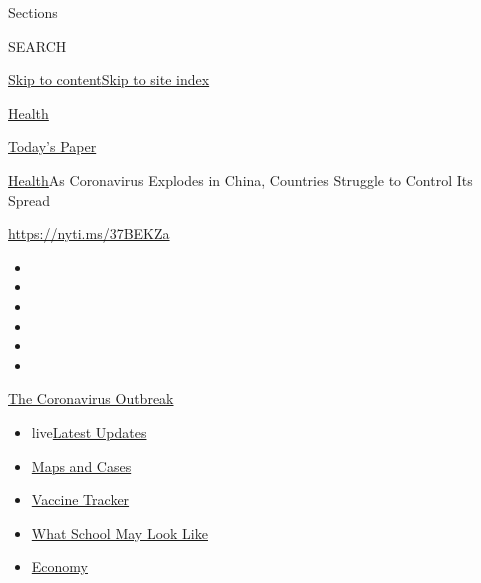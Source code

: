 Sections

SEARCH

\protect\hyperlink{site-content}{Skip to
content}\protect\hyperlink{site-index}{Skip to site index}

\href{https://www.nytimes.com/section/health}{Health}

\href{https://myaccount.nytimes.com/auth/login?response_type=cookie\&client_id=vi}{}

\href{https://www.nytimes.com/section/todayspaper}{Today's Paper}

\href{/section/health}{Health}\textbar{}As Coronavirus Explodes in
China, Countries Struggle to Control Its Spread

\url{https://nyti.ms/37BEKZa}

\begin{itemize}
\item
\item
\item
\item
\item
\item
\end{itemize}

\href{https://www.nytimes.com/news-event/coronavirus?action=click\&pgtype=Article\&state=default\&region=TOP_BANNER\&context=storylines_menu}{The
Coronavirus Outbreak}

\begin{itemize}
\tightlist
\item
  live\href{https://www.nytimes.com/2020/08/02/world/coronavirus-updates.html?action=click\&pgtype=Article\&state=default\&region=TOP_BANNER\&context=storylines_menu}{Latest
  Updates}
\item
  \href{https://www.nytimes.com/interactive/2020/us/coronavirus-us-cases.html?action=click\&pgtype=Article\&state=default\&region=TOP_BANNER\&context=storylines_menu}{Maps
  and Cases}
\item
  \href{https://www.nytimes.com/interactive/2020/science/coronavirus-vaccine-tracker.html?action=click\&pgtype=Article\&state=default\&region=TOP_BANNER\&context=storylines_menu}{Vaccine
  Tracker}
\item
  \href{https://www.nytimes.com/interactive/2020/07/29/us/schools-reopening-coronavirus.html?action=click\&pgtype=Article\&state=default\&region=TOP_BANNER\&context=storylines_menu}{What
  School May Look Like}
\item
  \href{https://www.nytimes.com/live/2020/07/31/business/stock-market-today-coronavirus?action=click\&pgtype=Article\&state=default\&region=TOP_BANNER\&context=storylines_menu}{Economy}
\end{itemize}

